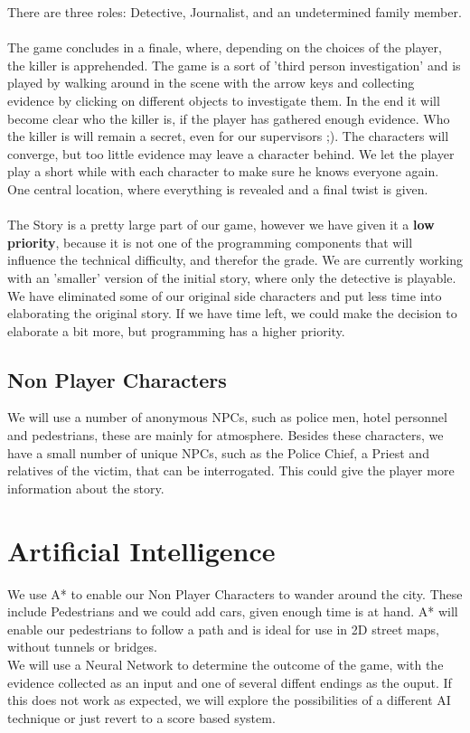 \documentclass{article}
\begin{document}
		There are three roles: Detective, Journalist, and an undetermined family member.\\ \\
		\noindent
		The game concludes in a finale, where, depending on the choices of the player, the killer is apprehended. The game is a sort of 'third person investigation' and is played by walking around in the scene with the arrow keys and collecting evidence by clicking on different objects to investigate them. In the end it will become clear who the killer is, if the player has gathered enough evidence. Who the killer is will remain a secret, even for our supervisors ;). The characters will converge, but too little evidence may leave a character behind. We let the player play a short while with each character to make sure he knows everyone again. One central location, where everything is revealed and a final twist is given. \\ \\
		\noindent
		The Story is a pretty large part of our game, however we have given it a \textbf{low priority}, because it is not one of the programming components that will influence the technical difficulty, and therefor the grade. We are currently working with an 'smaller' version of the initial story, where only the detective is playable. We have eliminated some of our original side characters and put less time into elaborating the original story. If we have time left, we could make the decision to elaborate a bit more, but programming has a higher priority.
	\subsection*{Non Player Characters}
		We will use a number of anonymous NPCs, such as police men, hotel personnel and pedestrians, these are mainly for atmosphere. Besides these characters, we have a small number of unique NPCs, such as the Police Chief, a Priest and relatives of the victim, that can be interrogated. This could give the player more information about the story.
\section{Artificial Intelligence}
	We use A* to enable our Non Player Characters to wander around the city. These include Pedestrians and we could add cars, given enough time is at hand. A* will enable our pedestrians to follow a path and is ideal for use in 2D street maps, without tunnels or bridges.\\
	We will use a Neural Network to determine the outcome of the game, with the evidence collected as an input and one of several diffent endings as the ouput. If this does not work as expected, we will explore the possibilities of a different AI technique or just revert to a score based system.
\end{document}
